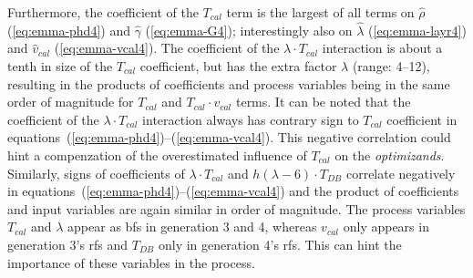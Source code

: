 %
Furthermore, the coefficient of the $T_{cal}$ term is the largest of all terms on $\hat{\rho}$ (\ref{eq:emma-phd4}) and $\hat{\gamma}$ (\ref{eq:emma-G4}); interestingly also on $\hat\lambda$ (\ref{eq:emma-layr4}) and $\hat{v}_{cal}$ (\ref{eq:emma-vcal4}).
The coefficient of the $\lambda\cdot T_{cal}$ interaction is about a tenth in size of the $T_{cal}$ coefficient, 
but has the extra factor $\lambda$ (range: 4--12), resulting in the products of coefficients and process variables being in the same order of magnitude for $T_{cal}$ and $T_{cal}\cdot v_{cal}$ terms.
It can be noted that the coefficient of the $\lambda\cdot T_{cal}$ interaction always has contrary sign to $T_{cal}$ coefficient in equations~(\ref{eq:emma-phd4})--(\ref{eq:emma-vcal4}). 
This negative correlation could hint a compenzation of the overestimated influence of $T_{cal}$ on the \textit{optimizands}.
Similarly, signs of coefficients of $\lambda \cdot T_{cal}$ and $h(\lambda -6) \cdot T_{DB}$ correlate negatively in equations~(\ref{eq:emma-phd4})--(\ref{eq:emma-vcal4}) and the product of coefficients and input variables are again similar in order of magnitude. 
%
The process variables $T_{cal}$ and $\lambda$ appear as \gls{bf}s in generation 3 and 4, whereas $v_{cal}$ only appears in generation 3's \gls{rf}s and $T_{DB}$ only in generation 4's \gls{rf}s.
This can hint the importance of these variables in the process. 

